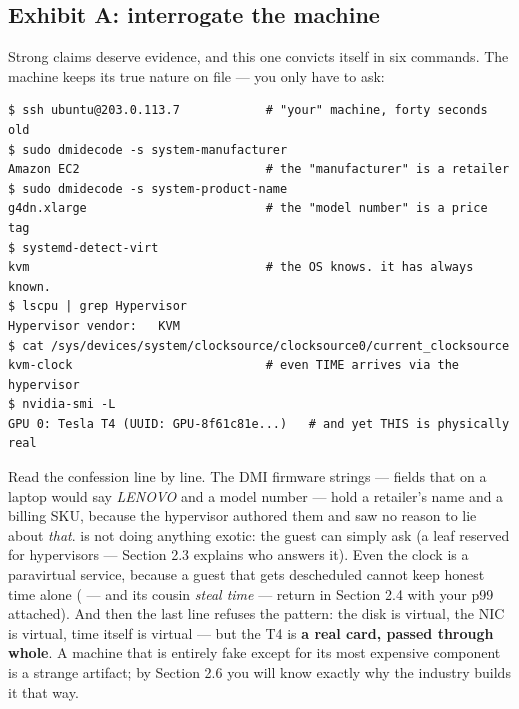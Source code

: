 \subsection*{Exhibit A: interrogate the machine}

Strong claims deserve evidence, and this one convicts itself in six commands. The machine keeps its true nature on file — you only have to ask:

\begin{terminalbox}
\begin{Verbatim}[breaklines=true,breakanywhere=true,fontsize=\small,formatcom=\color{tbbtermfg},codes=\tbbcodeactive]
$ ssh ubuntu@203.0.113.7            # "your" machine, forty seconds old
$ sudo dmidecode -s system-manufacturer
Amazon EC2                          # the "manufacturer" is a retailer
$ sudo dmidecode -s system-product-name
g4dn.xlarge                         # the "model number" is a price tag
$ systemd-detect-virt
kvm                                 # the OS knows. it has always known.
$ lscpu | grep Hypervisor
Hypervisor vendor:   KVM
$ cat /sys/devices/system/clocksource/clocksource0/current_clocksource
kvm-clock                           # even TIME arrives via the hypervisor
$ nvidia-smi -L
GPU 0: Tesla T4 (UUID: GPU-8f61c81e...)   # and yet THIS is physically real
\end{Verbatim}
\end{terminalbox}

Read the confession line by line. The DMI firmware strings — fields that on a laptop would say \textit{LENOVO} and a model number — hold a retailer's name and a billing SKU, because the hypervisor authored them and saw no reason to lie about \textit{that}.  is not doing anything exotic: the guest can simply ask (a  leaf reserved for hypervisors — Section 2.3 explains who answers it). Even the clock is a paravirtual service, because a guest that gets descheduled cannot keep honest time alone ( — and its cousin \textit{steal time} — return in Section 2.4 with your p99 attached). And then the last line refuses the pattern: the disk is virtual, the NIC is virtual, time itself is virtual — but the T4 is \textbf{a real card, passed through whole}. A machine that is entirely fake except for its most expensive component is a strange artifact; by Section 2.6 you will know exactly why the industry builds it that way.


